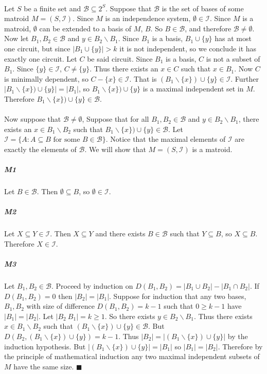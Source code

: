 \documentclass[letterpaper,12pt,oneside,onecolumn]{report}
\begin{document}
\paragraph{}
Let $S$ be a finite set and $\mathcal{B} \subseteq 2^S$. Suppose that $\mathcal{B}$ is the set of bases of some matroid $M = (S, \mathcal{I})$. Since $M$ is an independence system, $\emptyset \in \mathcal{I}$. Since $M$ is a matroid, $\emptyset$ can be extended to a basis of $M$, $B$. So $B \in \mathcal{B}$, and therefore $\mathcal{B} \neq \emptyset$. Now let $B_1, B_2 \in \mathcal{B}$ and $y \in B_2 \backslash B_1$. Since $B_1$ is a basis, $B_1 \cup \{y\}$ has at most one circuit, but since $|B_1 \cup \{y\}| > k$ it is not independent, so we conclude it has exactly	one circuit. Let $C$ be said circuit. Since $B_1$ is a basis, $C$ is not a subset of $B_1$. Since $\{y\} \in \mathcal{I}$, $C \neq \{y\}$. Thus there exists an $x \in C$ such that $x \in B_1$. Now $C$ is minimally dependent, so $C - \{x\} \in \mathcal{I}$. That is $(B_1 \backslash \{x\}) \cup \{y\} \in \mathcal{I}$. Further $|B_1 \backslash \{x\}) \cup \{y\}| = |B_1|$, so $B_1 \backslash \{x\}) \cup \{y\}$ is a maximal independent set in $M$. Therefore $B_1 \backslash \{x\}) \cup \{y\} \in \mathcal{B}$.
\paragraph{}
Now suppose that $\mathcal{B} \neq \emptyset$, Suppose that for all $B_1, B_2 \in \mathcal{B}$ and  $y \in B_2 \backslash B_1$, there exists an $x \in B_1 \backslash B_2$ such that $B_1 \backslash \{x\}) \cup \{y\} \in \mathcal{B}$. Let $\mathcal{I} = \{A : A \subseteq B \text{ for some } B \in \mathcal{B} \}$. Notice that the maximal elements of $\mathcal{I}$ are exactly the elements of $\mathcal{B}$. We will show that $M = (S, \mathcal{I})$ is a matroid.
\subparagraph{M1}
Let $B \in \mathcal{B}$. Then $\emptyset \subseteq B$, so $\emptyset \in \mathcal{I}$.
\subparagraph{M2}
Let $X \subseteq Y \in \mathcal{I}$. Then $X \subseteq Y$ and there exists $B \in \mathcal{B}$ such that $Y \subseteq B$, so $X \subseteq B$. Therefore $X \in \mathcal{I}$.
\subparagraph{M3}
Let $B_1, B_2 \in \mathcal{B}$. Proceed by induction on $D(B_1,B_2) = |B_1\cup B_2| - |B_1 \cap B_2|$. If $D(B_1, B_2) = 0$ then $|B_2| = |B_1|$. Suppose for induction that any two bases, $B_1,B_2$ with size of difference $D(B_1, B_2) = k-1$ such that $0 \geq k-1$ have $|B_1| = |B_2|$. Let $|B_2 \ B_1| = k \geq 1$. So there exists $y \in B_2 \backslash B_1$. Thus there exists $x \in B_1 \backslash B_2$ such that $(B_1 \backslash \{x\}) \cup \{y\} \in \mathcal{B}$. But $D(B_2,(B_1 \backslash \{x\}) \cup \{y\}) = k-1$. Thus $|B_2| = |(B_1 \backslash \{x\}) \cup \{y\}|$ by the induction hypothesis. But $|(B_1 \backslash \{x\}) \cup \{y\}| = |B_1|$ so $|B_1| = |B_2|$. Therefore by the principle of mathematical induction any two maximal independent subsets of $M$ have the same size. $\blacksquare$
\end{document}
